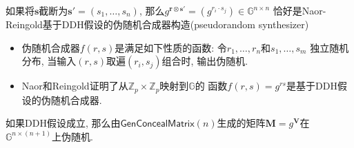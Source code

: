 \begin{remark}
如果将$\mathbf{s}$截断为$\mathbf{s}' = (s_1, \dots, s_n)$, 
那么$g^{\mathbf{r} \otimes \mathbf{s}'} = (g^{r_i \cdot s_j}) \in \mathbb{G}^{n \times n}$ 
恰好是Naor-Reingold基于DDH假设的伪随机合成器构造(pseudorandom synthesizer) 
\begin{itemize}
    \item 伪随机合成器$f(r,s)$是满足如下性质的函数: 令$r_1, \dots, r_n$和$s_1, \dots, s_m$
       独立随机分布, 当输入$(r, s)$取遍$(r_i, s_j)$组合时, 输出伪随机. 

    \item Naor和Reingold证明了从$\mathbb{Z}_p \times \mathbb{Z}_p$映射到$\mathbb{G}$的
       函数$f(r,s) = g^{rs}$是基于DDH假设的伪随机合成器.  
\end{itemize}
\end{remark}

\begin{lemma}
如果DDH假设成立, 那么由$\mathsf{GenConcealMatrix}(n)$生成的矩阵$\mathbf{M} = g^\mathbf{V}$在
$\mathbb{G}^{n \times (n+1)}$上伪随机.  
\end{lemma}

